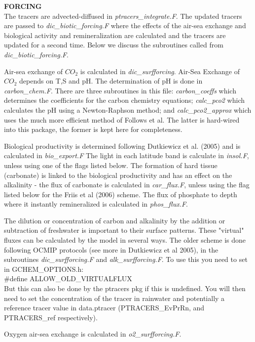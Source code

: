 \vspace{.5cm}

\noindent
{{\bf FORCING}}\\
The tracers are advected-diffused in {\it ptracers\_integrate.F}.
The updated tracers are passed to {\it dic\_biotic\_forcing.F}
where the effects of the air-sea exchange and biological
activity and remineralization are calculated and the tracers
are updated for a second time. Below we discuss the 
subroutines called from {\it dic\_biotic\_forcing.F}.


Air-sea exchange of $CO_2$ is calculated in {\it dic\_surfforcing}.
Air-Sea Exchange of $CO_2$ depends on T,S and pH. The determination
of pH is done in {\it carbon\_chem.F}. There are three subroutines
in this file: {\it carbon\_coeffs} which determines the coefficients
for the carbon chemistry equations; {\it calc\_pco2} which calculates
the pH using a Newton-Raphson method; and {\it calc\_pco2\_approx}
which uses the much more efficient method of Follows et al.
The latter is hard-wired into this package, the former is kept
here for completeness.

Biological productivity is determined following
Dutkiewicz et al. (2005) and is calculated in {\it bio\_export.F}
The light in each latitude band is calculate in {\it insol.F},
unless using one of the flags listed below.
The formation of hard tissue (carbonate) is linked to
the biological productivity and has an effect on the
alkalinity - the flux of carbonate is calculated in
{\it car\_flux.F}, unless using the flag listed below
for the Friis et al (2006) scheme. The flux of phosphate to depth where
it instantly remineralized is calculated in {\it phos\_flux.F}.

The dilution or concentration of  carbon and alkalinity by
the addition  or subtraction of freshwater is important to 
their surface patterns. These "virtual" fluxes can be calculated 
by the model in several ways.
The older scheme is done following OCMIP protocols (see
more in Dutkiewicz et al 2005), in the subroutines
{\it dic\_surfforcing.F} and {\it alk\_surfforcing.F}.
To use this you need to set in GCHEM\_OPTIONS.h:\\
\#define ALLOW\_OLD\_VIRTUALFLUX\\
But this can also be done by the ptracers pkg if this
is undefined. You will then need to set the concentration
of the tracer in rainwater and potentially a reference
tracer value in data.ptracer
(PTRACERS\_EvPrRn, and PTRACERS\_ref respectively).

Oxygen air-sea exchange is calculated in {\it o2\_surfforcing.F}.


